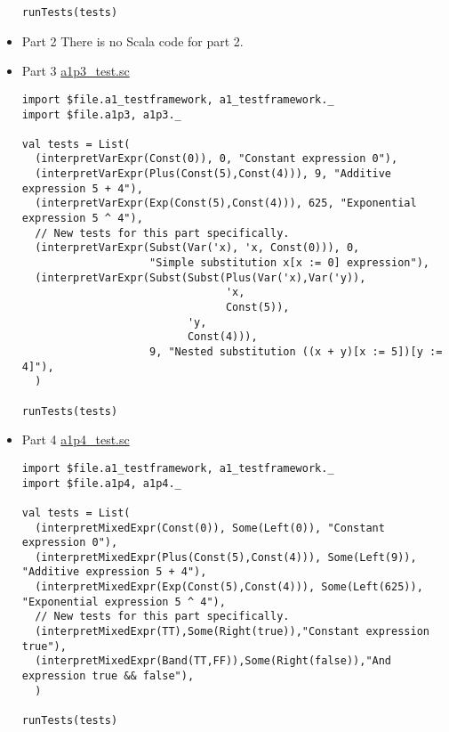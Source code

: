 \documentclass[11pt]{article}
\begin{document}
\begin{itemize}
\begin{verbatim}
runTests(tests)
\end{verbatim}

\item Part 2
\label{sec:org88adae2}
There is no Scala code for part 2.

\item Part 3
\label{sec:orga4a1c43}
\href{./testing/a1/a1p3\_test.sc}{a1p3\_test.sc}
\begin{verbatim}
import $file.a1_testframework, a1_testframework._
import $file.a1p3, a1p3._

val tests = List(
  (interpretVarExpr(Const(0)), 0, "Constant expression 0"),
  (interpretVarExpr(Plus(Const(5),Const(4))), 9, "Additive expression 5 + 4"),
  (interpretVarExpr(Exp(Const(5),Const(4))), 625, "Exponential expression 5 ^ 4"),
  // New tests for this part specifically.
  (interpretVarExpr(Subst(Var('x), 'x, Const(0))), 0,
                    "Simple substitution x[x := 0] expression"),
  (interpretVarExpr(Subst(Subst(Plus(Var('x),Var('y)),
                                'x,
                                Const(5)),
                          'y,
                          Const(4))),
                    9, "Nested substitution ((x + y)[x := 5])[y := 4]"),
  )

runTests(tests)
\end{verbatim}

\item Part 4
\label{sec:orgc5218fa}
\href{./testing/a1/a1p4\_test.sc}{a1p4\_test.sc}
\begin{verbatim}
import $file.a1_testframework, a1_testframework._
import $file.a1p4, a1p4._

val tests = List(
  (interpretMixedExpr(Const(0)), Some(Left(0)), "Constant expression 0"),
  (interpretMixedExpr(Plus(Const(5),Const(4))), Some(Left(9)), "Additive expression 5 + 4"),
  (interpretMixedExpr(Exp(Const(5),Const(4))), Some(Left(625)), "Exponential expression 5 ^ 4"),
  // New tests for this part specifically.
  (interpretMixedExpr(TT),Some(Right(true)),"Constant expression true"),
  (interpretMixedExpr(Band(TT,FF)),Some(Right(false)),"And expression true && false"),
  )

runTests(tests)
\end{verbatim}
\end{itemize}
\end{document}
